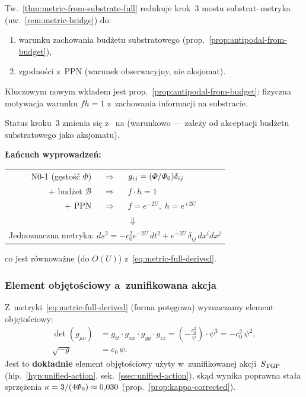 \begin{remark}%
\label{rem:step3-elimination}
Tw.~\ref{thm:metric-from-substrate-full} redukuje
krok~3 mostu substrat--metryka
(uw.~\ref{rem:metric-bridge}) do:
\begin{enumerate}[nosep]
  \item warunku zachowania bud\.zetu substratowego
        (prop.~\ref{prop:antipodal-from-budget}),
  \item zgodno\'sci z~PPN (warunek obserwacyjny, nie aksjomat).
\end{enumerate}
Kluczowym nowym wk\l{}adem jest
prop.~\ref{prop:antipodal-from-budget}: fizyczna motywacja
warunku $fh = 1$ z~zachowania informacji na substracie.

Status kroku~3 zmienia si\k{e} z~
na  (warunkowo --- zale\.zy
od akceptacji bud\.zetu substratowego jako aksjomatu).

\medskip\noindent
\textbf{Łańcuch wyprowadze\'n:}
\begin{center}
\begin{tabular}{rcl}
  N0-1 (g\k{e}sto\'s\'c $\Phi$) & $\Longrightarrow$ & $g_{ij} = (\varPhi/\varPhi_0)\delta_{ij}$ \\
  $+$ bud\.zet $\mathcal{B}$ & $\Longrightarrow$ & $f\cdot h = 1$ \\
  $+$ PPN & $\Longrightarrow$ & $f = e^{-2U},\; h = e^{+2U}$ \\
  && $\Downarrow$ \\
  \multicolumn{3}{c}{Jednoznaczna metryka: $ds^2 = -c_0^2 e^{-2U}\,dt^2 + e^{+2U}\,\delta_{ij}\,dx^i dx^j$}
\end{tabular}
\end{center}
co jest r\'ownowa\.zne (do $O(U)$) z~\eqref{eq:metric-full-derived}.
\end{remark}

\subsubsection{Element obj\k{e}to\'sciowy a~zunifikowana akcja}%
\label{sssec:volume-element-check}

Z~metryki~\eqref{eq:metric-full-derived} (forma pot\k{e}gowa)
wyznaczamy element obj\k{e}to\'sciowy:
\begin{align}
  \det(g_{\mu\nu})
  &= g_{tt}\cdot g_{xx}\cdot g_{yy}\cdot g_{zz}
  = \left(-\frac{c_0^2}{\psi}\right)\cdot \psi^3
  = -c_0^2\,\psi^2, \nonumber\\[4pt]
  \sqrt{-g}
  &= c_0\,\psi.
  \label{eq:vol-element-derived}
\end{align}
Jest to \textbf{dok\l{}adnie} element obj\k{e}to\'sciowy u\.zyty
w~zunifikowanej akcji~$S_{\rm TGP}$
(hip.~\ref{hyp:unified-action}, sek.~\ref{ssec:unified-action}),
sk\k{a}d wynika poprawna sta\l{}a sprz\k{e}\.zenia
$\kappa = 3/(4\varPhi_0) \approx 0{,}030$
(prop.~\ref{prop:kappa-corrected}).

